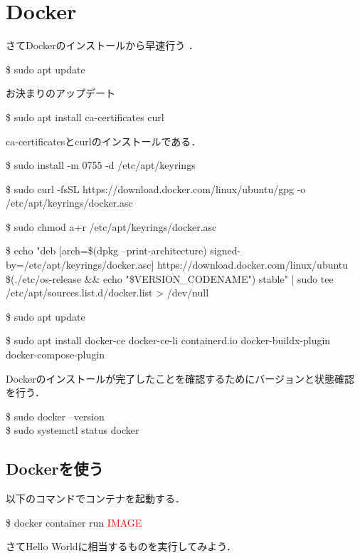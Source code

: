 \documentclass[dvipdfmx,a4paper,11pt]{jsbook}
\begin{document}
\chapter{Docker}
さてDockerのインストールから早速行う  ．
\begin{tcolorbox}[terminalbox]
  \$ sudo apt update
\end{tcolorbox}
お決まりのアップデート
\begin{tcolorbox}[terminalbox]
  \$ sudo apt install ca-certificates curl
\end{tcolorbox}
ca-certificatesとcurlのインストールである．
\begin{tcolorbox}[terminalbox]
  \$ sudo install -m 0755 -d /etc/apt/keyrings
\end{tcolorbox}
\begin{tcolorbox}[terminalbox]
  \$ sudo curl -fsSL https://download.docker.com/linux/ubuntu/gpg -o /etc/apt/keyrings/docker.asc
\end{tcolorbox}
\begin{tcolorbox}[terminalbox]
  \$ sudo chmod a+r /etc/apt/keyrings/docker.asc
\end{tcolorbox}
\begin{tcolorbox}[terminalbox]
  \$ echo "deb [arch=\$(dpkg --print-architecture) signed-by=/etc/apt/keyrings/docker.asc] https://download.docker.com/linux/ubuntu \$(./etc/os-release \&\& echo "\$VERSION\_CODENAME") stable" | sudo tee /etc/apt/sources.list.d/docker.list > /dev/null
\end{tcolorbox}

\begin{tcolorbox}[terminalbox]
  \$ sudo apt update
\end{tcolorbox}
\begin{tcolorbox}[terminalbox]
  \$ sudo apt install docker-ce docker-ce-li containerd.io docker-buildx-plugin docker-compose-plugin
\end{tcolorbox}
Dockerのインストールが完了したことを確認するためにバージョンと状態確認を行う．
\begin{tcolorbox}[terminalbox]
  \$ sudo docker --version\\
  \$ sudo systemctl status docker
\end{tcolorbox}

\section{Dockerを使う}
以下のコマンドでコンテナを起動する．
\begin{tcolorbox}[terminalbox]
  \$ docker container run \textcolor{red}{IMAGE}
\end{tcolorbox}
さてHello Worldに相当するものを実行してみよう．
\end{document}
